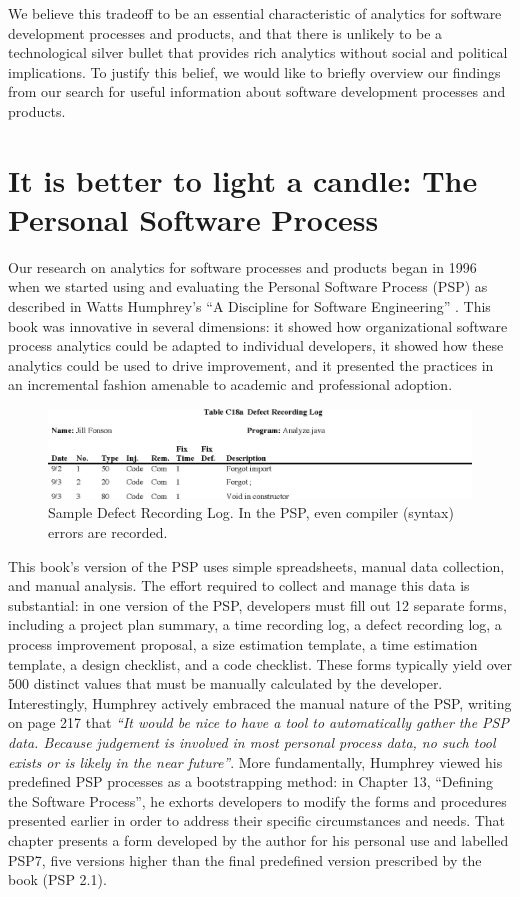 \documentclass[]{article}
\begin{document}
We believe this tradeoff to be an essential characteristic of analytics for software
development processes and products, and that there is unlikely to be a technological
silver bullet that provides rich analytics without social and political implications.  To
justify this belief, we would like to briefly overview our findings from our search for
useful information about software development processes and products.

\section{It is better to light a candle: The Personal Software Process}

Our research on analytics for software processes and products began in 1996 when we
started using and evaluating the Personal Software Process (PSP) as described in Watts
Humphrey's ``A Discipline for Software Engineering'' \cite{Humphrey95}. This book was
innovative in several dimensions: it showed how organizational software process analytics
could be adapted to individual developers, it showed how these analytics could be used to
drive improvement, and it presented the practices in an incremental fashion amenable to
academic and professional adoption.

\begin{figure}[!tb]
\centering
\includegraphics[width=0.95\columnwidth]{defects.eps}
\caption{Sample Defect Recording Log. In the PSP, even compiler (syntax) errors are recorded.}
\label{fig:defect-log}
\end{figure}
 
This book's version of the PSP uses simple spreadsheets, manual data collection, and
manual analysis. The effort required to collect and manage this data is substantial: in
one version of the PSP, developers must fill out 12 separate forms, including a project
plan summary, a time recording log, a defect recording log, a process improvement
proposal, a size estimation template, a time estimation template, a design checklist, and
a code checklist. These forms typically yield over 500 distinct values that must be
manually calculated by the developer.  Interestingly, Humphrey actively embraced the
manual nature of the PSP, writing on page 217 that {\em ``It would be nice to have a tool
  to automatically gather the PSP data. Because judgement is involved in most personal
  process data, no such tool exists or is likely in the near future''}.  More
fundamentally, Humphrey viewed his predefined PSP processes as a
bootstrapping method: in Chapter 13, ``Defining the Software Process'', he exhorts
developers to modify the forms and procedures presented earlier in order to address their
specific circumstances and needs. That chapter presents a form developed by the author for
his personal use and labelled PSP7, five versions higher than the final predefined version prescribed
by the book (PSP 2.1).
\end{document}
